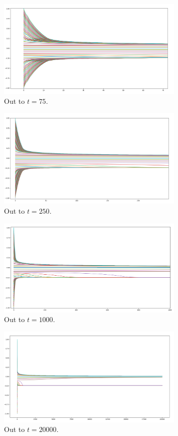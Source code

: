 \begin{figure}[h]
    \centering
    \includegraphics[width = 0.8\textwidth]{Images/p1f1.png}
    \caption{Out to $t = 75$.}
    \label{fig:p1f1}
\end{figure}
\begin{figure}
    \centering
    \includegraphics[width = 0.8\textwidth]{Images/p1f2.png}
    \caption{Out to $t = 250$.}
    \label{fig:p1f2}
\end{figure}
\begin{figure}
    \centering
    \includegraphics[width = 0.8\textwidth]{Images/p1f3.png}
    \caption{Out to $t = 1000$.}
    \label{fig:p1f3}
\end{figure}
\begin{figure}
    \centering
    \includegraphics[width = 0.8\textwidth]{Images/p1f4.png}
    \caption{Out to $t = 20000$.}
    \label{fig:p1f4}
\end{figure}

